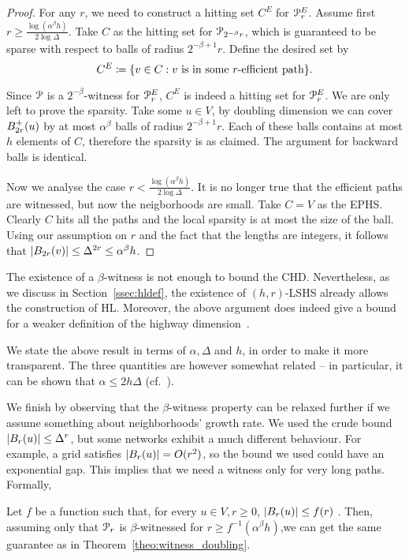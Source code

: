 \begin{proof}
For any $r$, we need to construct a hitting set $C^E$ for $\mathcal{P}_r^E$.
Assume first $r\geq \frac{\log(\alpha^\beta h)}{2\log\Delta}$.
Take $C$ as the hitting set for $\mathcal{P}_{2^{-\beta}r}$, which is guaranteed to be sparse with respect to balls of radius $2^{-\beta+1}r$.
Define the desired set by
\[
C^E\coloneqq\{v\in C: v \text{ is in some $r$-efficient path} \}.
\]

Since $\mathcal{P}$ is a $2^{-\beta}$-witness for $\mathcal{P}^E_r$, $C^E$ is indeed a hitting set for $\mathcal{P}^E_r$.
We are only left to prove the sparsity.
Take some $u\in V$, by doubling dimension we can cover $B^+_{2r}(u)$ by at most $\alpha^\beta$ balls of radius $2^{-\beta+1}r$.
Each of these balls contains at most $h$ elements of $C$, therefore the sparsity is as claimed.
The argument for backward balls is identical.

Now we analyse the case $r< \frac{\log(\alpha^\beta h)}{2\log\Delta}$.
It is no longer true that the efficient paths are witnessed, but now the neigborhoods are small.
Take $C=V$ as the EPHS.
Clearly $C$ hits all the paths and the local sparsity is at most the size of the ball.
Using our assumption on $r$ and the fact that the lengths are integers, it follows that $\lvert B_{2r}(v)\rvert\leq\Delta^{2r}\leq\alpha^\beta h$. 
\end{proof}
\begin{remark}
The existence of a $\beta$-witness is not enough to bound the CHD. Nevertheless, as we discuss in Section~\ref{ssec:hldef}, the existence of $(h,r)$-LSHS already allows the construction of HL. Moreover, the above argument does indeed give a bound for a weaker definition of the highway dimension~\cite{highway2010}.
\end{remark}
\begin{remark}
We state the above result in terms of $\alpha, \Delta$ and $h$, in order to make it more transparent. The three quantities are however somewhat related -- in particular, it can be shown that $\alpha\leq 2h\Delta$ (cf.~\cite{skeleton}).
\end{remark}

We finish by observing that the $\beta$-witness property can be relaxed further if we assume something about neighborhoods' growth rate.
We used the crude bound $\lvert B_r(u)\rvert\leq \Delta^r$, but some networks exhibit a much different behaviour.
For example, a grid satisfies  $\lvert B_r(u)\rvert=O(r^2)$, so the bound we used could have an exponential gap.
This implies that we need a witness only for very long paths.
Formally,

\begin{corollary}
Let $f$ be a function such that, for every $u\in V, r\geq 0$, $\lvert B_r(u)\rvert\leq f(r)$ .
Then, assuming only that $\mathcal{P}_r$ is $\beta$-witnessed for $r\geq f^{-1}(\alpha^\beta h)$,we can get the same guarantee as in Theorem~\ref{theo:witness_doubling}.
\end{corollary}

